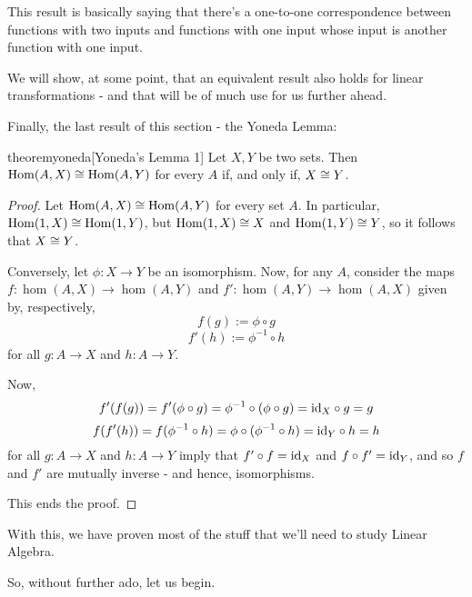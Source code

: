 \begin{rmk}
	This result is basically saying that there's a one-to-one correspondence between functions with two inputs and functions with one input whose input is another function with one input.
\end{rmk}

We will show, at some point, that an equivalent result also holds for linear transformations - and that will be of much use for us further ahead.

Finally, the last result of this section - the Yoneda Lemma:

\begin{restatable}{theorem}{yoneda}\label{thm:yoneda1}[Yoneda's Lemma 1]
	Let $X,Y$ be two sets. Then $\mathrm{Hom}(A,X)\cong\mathrm{Hom}(A,Y)$ for every $A$ if, and only if, $X\cong Y$.
\end{restatable}
\begin{proof}
	Let $\mathrm{Hom}(A,X)\cong \mathrm{Hom}(A,Y)$ for every set $A$. In particular, $\mathrm{Hom}(1,X)\cong\mathrm{Hom}(1,Y)$, but $\mathrm{Hom}(1,X)\cong X$ and $\mathrm{Hom}(1,Y)\cong Y$, so it follows that $X\cong Y$.
	
	\bigskip
	Conversely, let $\phi:X\to Y$ be an isomorphism. Now, for any $A$, consider the maps $f:\hom(A,X)\to\hom(A,Y)$ and $f':\hom(A,Y)\to\hom(A,X)$ given by, respectively,
	\[f(g):=\phi\circ g\]
	\[f'(h):=\phi^{-1}\circ h\]for all $g:A\to X$ and $h:A\to Y$.
	
	Now,
	\[f'(f(g))=f'(\phi\circ g)=\phi^{-1}\circ( \phi\circ g)={\rm id}_X\circ g=g\]
	\[f(f'(h))=f(\phi^{-1}\circ h)=\phi\circ(\phi^{-1}\circ h)={\rm id}_Y\circ h=h\]for all $g:A\to X$ and $h:A\to Y$ imply that $f'\circ f={\rm id}_X$ and $f\circ f'={\rm id}_Y$, and so $f$ and $f'$ are mutually inverse - and hence, isomorphisms.
	
	This ends the proof.
\end{proof}



With this, we have proven most of the stuff that we'll need to study Linear Algebra.

So, without further ado, let us begin.